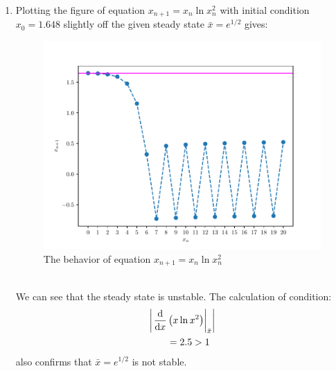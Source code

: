 \begin{homeworkProblem}[2]
\begin{enumerate}
\item Plotting the figure of equation $x_{n+1} = x_n \ln x_n^2$ with initial
condition $x_0 = 1.648$ slightly off the given steady state $\bar x = e^{1/2}$
gives:
\begin{figure}
    \centering
    \caption{The behavior of equation $x_{n+1} = x_n \ln x_n^2$}
    \includegraphics[scale=0.6]{../fig/fig2(d)}
\end{figure}
\\
We can see that the steady state is unstable. The calculation of condition:
\[
    \begin{aligned}
        &\left|\left.\frac{\mathrm{d}}{\mathrm{d}x} \left(x\ln x^2\right)\right|_{\bar x}\right|\\
        &\qquad = 2.5 > 1
    \end{aligned}
\]
also confirms that $\bar x = e^{1/2}$ is not stable.
\end{enumerate}
\end{homeworkProblem}